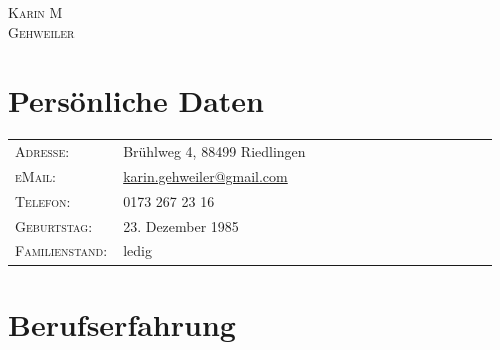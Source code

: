 \documentclass[a4paper,10pt]{article} %
\begin{document}



\par{\Huge \textsc{Karin M \\Gehweiler}\bigskip\par} %


\section{Persönliche Daten}

\begin{tabular}{R{0.2\linewidth}p{0.76\linewidth}}
\textsc{Adresse:} & Brühlweg 4, 88499 Riedlingen \\
\textsc{eMail:} &\href{mailto:karin.gehweiler@gmail.com}{karin.gehweiler@gmail.com}\\
\textsc{Telefon:} & 0173 267 23 16\\
\textsc{Geburtstag:} & 23. Dezember 1985\\
\textsc{Familienstand:} & ledig\\
\end{tabular}


\section{Berufserfahrung}
\end{document}
